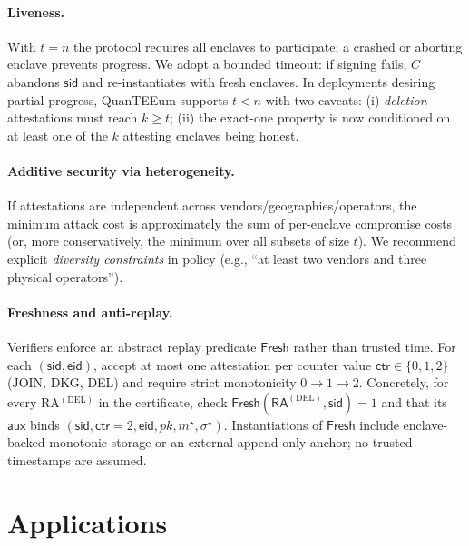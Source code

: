 \documentclass[runningheads,orivec]{llncs}
\newcommand{\prot}{\textsf{QuanTEEum}}
\newcommand{\sid}{\mathsf{sid}}
\begin{document}
\paragraph{Liveness.}
With $t=n$ the protocol requires all enclaves to participate; a crashed or aborting enclave prevents progress. We adopt a bounded timeout: if signing fails, $C$ abandons $\sid$ and re-instantiates with fresh enclaves. In deployments desiring partial progress, \prot{} supports $t<n$ with two caveats: (i) \emph{deletion} attestations must reach $k\!\ge\!t$; (ii) the exact-one property is now conditioned on at least one of the $k$ attesting enclaves being honest.

\paragraph{Additive security via heterogeneity.}
If attestations are independent across vendors/geographies/operators, the minimum attack cost is approximately the sum of per-enclave compromise costs (or, more conservatively, the minimum over all subsets of size $t$). We recommend explicit \emph{diversity constraints} in policy (e.g., “at least two vendors and three physical operators”).

\paragraph{Freshness and anti-replay.}
Verifiers enforce an abstract replay predicate $\textsf{Fresh}$ rather than trusted time. For each $(\sid,\mathsf{eid})$, accept at most one attestation per counter value $\mathsf{ctr}\!\in\!\{0,1,2\}$ (JOIN, DKG, DEL) and require strict monotonicity $0\!\rightarrow\!1\!\rightarrow\!2$. Concretely, for every RA$^{(\mathrm{DEL})}$ in the certificate, check $\textsf{Fresh}(\mathsf{RA}^{(\mathrm{DEL})},\sid){=}1$ and that its $\mathsf{aux}$ binds $(\sid,\mathsf{ctr}{=}2,\mathsf{eid},pk,m^{\star},\sigma^{\star})$. Instantiations of $\textsf{Fresh}$ include enclave-backed monotonic storage or an external append-only anchor; no trusted timestamps are assumed.

\section{Applications}\label{sec:apps}
\end{document}
